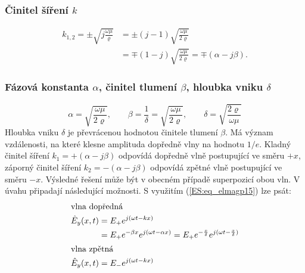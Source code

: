 {     \subsubsection{Činitel šíření \(k\)} 
       \begin{align}\label{ES:eq_elmagp47}
         k_{1,2} = \pm\sqrt{j\frac{\omega\mu}{\varrho}}            
                &= \pm(j-1)\sqrt{\frac{\omega\mu}{2\varrho}}      \nonumber \\
                &= \mp(1-j)\sqrt{\frac{\omega\mu}{2\varrho}} 
                 = \mp(\alpha - j\beta).
       \end{align}       

      \subsubsection{Fázová konstanta \(\alpha\), činitel tlumení \(\beta\), hloubka vniku  
                     \(\delta\)}
        \begin{equation}\label{ES:eq_elmagp48}
          \alpha = \sqrt{\frac{\omega\mu}{2\varrho}}, \qquad
           \beta = \frac{1}{\delta} = \sqrt{\frac{\omega\mu}{2\varrho}}, \qquad
          \delta = \sqrt{\frac{2\varrho}{\omega\mu}}  
        \end{equation} 
        Hloubka vniku \(\delta\) je převrácenou hodnotou činitele tlumení \(\beta\). Má význam 
        vzdálenosti, na které klesne amplituda dopředně vlny na hodnotu \(1/e\). Kladný činitel 
        šíření \(k_1 = +(\alpha - j\beta)\) odpovídá dopředně vlně postupující ve směru \(+x\), 
        záporný činitel šíření \(k_2 = -(\alpha - j\beta)\) odpovídá zpětné vlně postupující ve 
        směru \(-x\). Výsledné řešení může být v obecném případě superpozicí obou vln. V úvahu 
        připadají následující možnosti. S využitím (\ref{ES:eq_elmagp15}) lze psát:
        \begin{subequations}
          \begin{align}
            \shortintertext{vlna dopředná}
            \hat{E}_y(x,t) 
              &= E_+e^{j(\omega t - kx)}                                                \nonumber \\
              &= E_+e^{-\beta x}e^{j(\omega t - \alpha x)}         
               = E_+e^{-\frac{x}{\delta}}e^{j(\omega t-\frac{x}{\delta})} \label{ES:eq_elmagp49a} \\
            \shortintertext{vlna zpětná}
            \hat{E}_y(x,t) 
              &= E_-e^{j(\omega t - kx)}                                                \nonumber \\

\end{align}
\end{subequations}}
